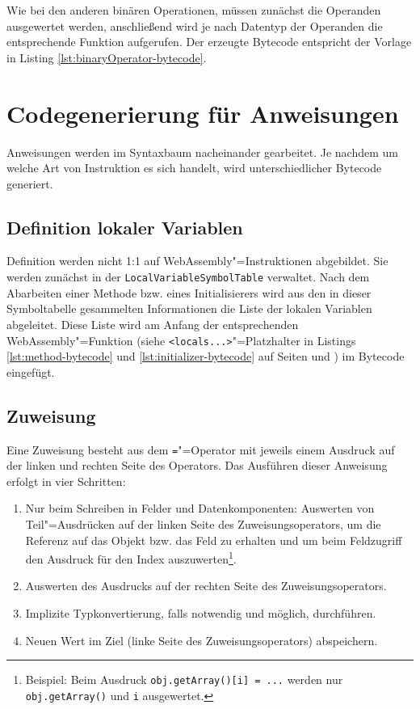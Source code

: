 Wie bei den anderen binären Operationen, müssen zunächst die Operanden ausgewertet werden, anschließend wird je nach Datentyp der Operanden die entsprechende Funktion aufgerufen. Der erzeugte Bytecode entspricht der Vorlage in Listing \ref{lst:binaryOperator-bytecode}.



\section{Codegenerierung für Anweisungen}

Anweisungen werden im Syntaxbaum nacheinander gearbeitet. Je nachdem um welche Art von Instruktion es sich handelt, wird unterschiedlicher Bytecode generiert.

\subsection{Definition lokaler Variablen}

Definition werden nicht 1:1 auf WebAssembly"=Instruktionen abgebildet. Sie werden zunächst in der \lstinline{LocalVariableSymbolTable} verwaltet. Nach dem Abarbeiten einer Methode bzw. eines Initialisierers wird aus den in dieser Symboltabelle gesammelten Informationen die Liste der lokalen Variablen abgeleitet. Diese Liste wird am Anfang der entsprechenden WebAssembly"=Funktion (siehe \lstinline{<locals...>}"=Platzhalter in Listings \ref{lst:method-bytecode} und \ref{lst:initializer-bytecode} auf Seiten \pageref{lst:method-bytecode} und \pageref{lst:initializer-bytecode}) im Bytecode eingefügt.

\subsection{Zuweisung}
\label{subsec:Zuweisung}
Eine Zuweisung besteht aus dem \lstinline{=}"=Operator mit jeweils einem Ausdruck auf der linken und rechten Seite des Operators. Das Ausführen dieser Anweisung erfolgt in vier Schritten:
\begin{enumerate}
    \item Nur beim Schreiben in Felder und Datenkomponenten: Auswerten von Teil"=Ausdrücken auf der linken Seite des Zuweisungsoperators, um die Referenz auf das Objekt bzw. das Feld zu erhalten und um beim Feldzugriff den Ausdruck für den Index auszuwerten\footnote{Beispiel: Beim Ausdruck \lstinline{obj.getArray()[i] = ...} werden nur \lstinline{obj.getArray()} und \lstinline{i} ausgewertet.}.
    \item Auswerten des Ausdrucks auf der rechten Seite des Zuweisungsoperators.
    \item Implizite Typkonvertierung, falls notwendig und möglich, durchführen.
    \item Neuen Wert im Ziel (linke Seite des Zuweisungsoperators) abspeichern. 
\end{enumerate}

